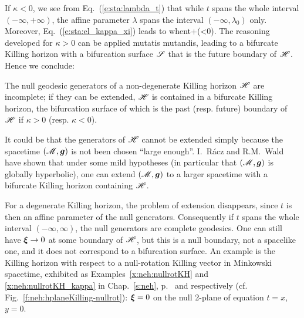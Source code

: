 If $\kappa<0$, we see from Eq.~(\ref{e:sta:lambda_t}) that while $t$ spans the
whole interval $(-\infty,+\infty)$, the affine parameter $\lambda$ spans the
interval $(-\infty,\lambda_0)$ only. Moreover, Eq.~(\ref{e:sta:el_kappa_xi})
leads to
\be
    \w{\xi}  \quad\mbox{when}\quad t\rightarrow +\infty  \qquad (\kappa<0).
\ee
The reasoning developed for $\kappa>0$ can be applied mutatis mutandis,
leading to a bifurcate Killing horizon with a bifurcation surface $\mathscr{S}$ that
is the future boundary of $\mathscr{H}$. Hence we conclude:
\begin{prop}
\label{p:sta:non_degen_bifurcate}
The null geodesic generators of a non-degenerate Killing horizon $\mathscr{H}$ are
incomplete; if they can be extended, $\mathscr{H}$ is contained in a
bifurcate Killing horizon, the bifurcation surface of which is the past
(resp. future) boundary of $\mathscr{H}$ if $\kappa>0$ (resp. $\kappa<0$).
\end{prop}

\begin{remark}
\label{r:sta:extension_bifurcate}
It could be that the generators of $\mathscr{H}$ cannot be extended simply
because the spacetime $(\mathscr{M},\bm{g})$ is not been chosen ``large enough''.
I.~R\'acz and R.M.~Wald \cite{RaczW96}
have shown that under some mild hypotheses (in particular that $(\mathscr{M},\bm{g})$ is globally
hyperbolic), one can extend $(\mathscr{M},\bm{g})$ to a larger spacetime with a bifurcate
Killing horizon containing $\mathscr{H}$.
\end{remark}

\begin{remark}
For a degenerate Killing horizon, the problem of extension disappears, since
$t$ is then an affine parameter of the null generators. Consequently if $t$ spans
the whole interval $(-\infty,\infty)$, the null generators are complete
geodesics. One can still have $\bm{\xi}\rightarrow 0$ at some boundary
of $\mathscr{H}$, but this is a null boundary, not a spacelike one, and it does not
correspond to a bifurcation surface. An example is the Killing horizon with
respect to a null-rotation Killing vector in Minkowski spacetime, exhibited
as Examples~\ref{x:neh:nullrotKH} and \ref{x:neh:nullrotKH_kappa}
in Chap.~\ref{s:neh}, p.~\pageref{x:neh:nullrotKH} and \pageref{x:neh:nullrotKH_kappa}
respectively (cf. Fig.~\ref{f:neh:hplaneKilling-nullrot}): $\bm{\xi}=0$
on the null 2-plane of equation $t=x$, $y=0$.
\end{remark}

